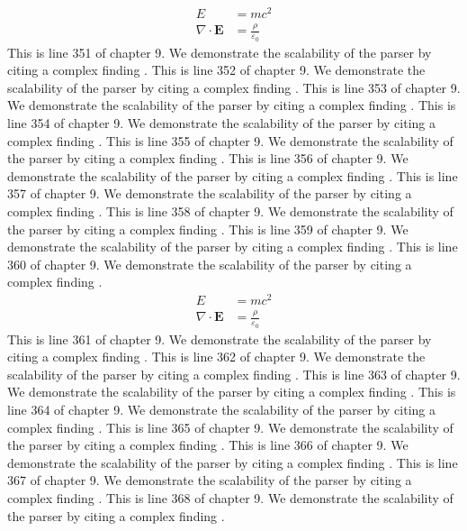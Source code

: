 \begin{align*}
  E &= mc^2 \\
  \nabla \cdot \mathbf{E} &= \frac{\rho}{\varepsilon_0}
\end{align*}
This is line 351 of chapter 9. We demonstrate the scalability of the parser by citing a complex finding \cite{ref9_351}.
This is line 352 of chapter 9. We demonstrate the scalability of the parser by citing a complex finding \cite{ref9_352}.
This is line 353 of chapter 9. We demonstrate the scalability of the parser by citing a complex finding \cite{ref9_353}.
This is line 354 of chapter 9. We demonstrate the scalability of the parser by citing a complex finding \cite{ref9_354}.
This is line 355 of chapter 9. We demonstrate the scalability of the parser by citing a complex finding \cite{ref9_355}.
This is line 356 of chapter 9. We demonstrate the scalability of the parser by citing a complex finding \cite{ref9_356}.
This is line 357 of chapter 9. We demonstrate the scalability of the parser by citing a complex finding \cite{ref9_357}.
This is line 358 of chapter 9. We demonstrate the scalability of the parser by citing a complex finding \cite{ref9_358}.
This is line 359 of chapter 9. We demonstrate the scalability of the parser by citing a complex finding \cite{ref9_359}.
This is line 360 of chapter 9. We demonstrate the scalability of the parser by citing a complex finding \cite{ref9_360}.
\begin{align*}
  E &= mc^2 \\
  \nabla \cdot \mathbf{E} &= \frac{\rho}{\varepsilon_0}
\end{align*}
This is line 361 of chapter 9. We demonstrate the scalability of the parser by citing a complex finding \cite{ref9_361}.
This is line 362 of chapter 9. We demonstrate the scalability of the parser by citing a complex finding \cite{ref9_362}.
This is line 363 of chapter 9. We demonstrate the scalability of the parser by citing a complex finding \cite{ref9_363}.
This is line 364 of chapter 9. We demonstrate the scalability of the parser by citing a complex finding \cite{ref9_364}.
This is line 365 of chapter 9. We demonstrate the scalability of the parser by citing a complex finding \cite{ref9_365}.
This is line 366 of chapter 9. We demonstrate the scalability of the parser by citing a complex finding \cite{ref9_366}.
This is line 367 of chapter 9. We demonstrate the scalability of the parser by citing a complex finding \cite{ref9_367}.
This is line 368 of chapter 9. We demonstrate the scalability of the parser by citing a complex finding \cite{ref9_368}.
